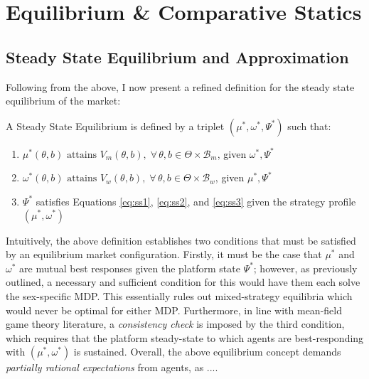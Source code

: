 \section{Equilibrium \& Comparative Statics}
\label{sec:section3} 
\subsection{Steady State Equilibrium and Approximation}\label{sec:section3.1} 
Following from the above, I now present a refined definition for the steady state equilibrium of the market: 
\begin{definition}
    A Steady State Equilibrium is defined by a triplet $(\mu^*, \omega^*, \Psi^*)$ such that:
    \begin{enumerate}
        \item $ \mu^*(\theta,b) \text{ attains } V_m(\theta,b), \; \forall\, \theta, b \in \Theta \times \mathcal{B}_m$, given $\omega^*,\Psi^*$
        \item $ \omega^*(\theta,b) \text{ attains } V_w(\theta,b), \; \forall\, \theta, b \in \Theta \times \mathcal{B}_w$, given $\mu^*,\Psi^*$
        \item $\Psi^*$ satisfies Equations \ref{eq:ss1}, \ref{eq:ss2}, and \ref{eq:ss3} given the strategy profile $(\mu^*, \omega^*)$
    \end{enumerate} 
\end{definition}

Intuitively, the above definition establishes two conditions that must be satisfied by an equilibrium market configuration. Firstly, it must be the case that $\mu^*$ and $\omega^*$ are mutual best responses given the platform state $\Psi^*$; however, as previously outlined, a necessary and sufficient condition for this would have them each solve the sex-specific MDP. This essentially rules out mixed-strategy equilibria which would never be optimal for either MDP. Furthermore, in line with mean-field game theory literature, a \textit{consistency check} is imposed by the third condition, which requires that the platform steady-state to which agents are best-responding with $(\mu^*,\omega^*)$ is sustained. Overall, the above equilibrium concept demands \textit{partially rational expectations} from agents, as ....

